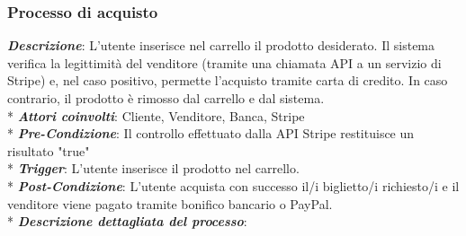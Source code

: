 \subsubsection{Processo di acquisto} \label{acquisto}
\textbf{\textit{Descrizione}}: L'utente inserisce nel carrello il prodotto desiderato. Il sistema verifica la legittimità del venditore (tramite una chiamata API a un servizio di Stripe) e, nel caso positivo, permette l'acquisto tramite carta di credito. In caso contrario, il prodotto è rimosso dal carrello e dal sistema. \\*
\textbf{\textit{Attori coinvolti}}: Cliente, Venditore, Banca, Stripe \\*
\textbf{\textit{Pre-Condizione}}: Il controllo effettuato dalla API Stripe restituisce un risultato "true" \\*
\textbf{\textit{Trigger}}: L'utente inserisce il prodotto nel carrello. \\*
\textbf{\textit{Post-Condizione}}: L'utente acquista con successo il/i biglietto/i richiesto/i e il venditore viene pagato tramite bonifico bancario o PayPal. \\*
\textbf{\textit{Descrizione dettagliata del processo}}: 
